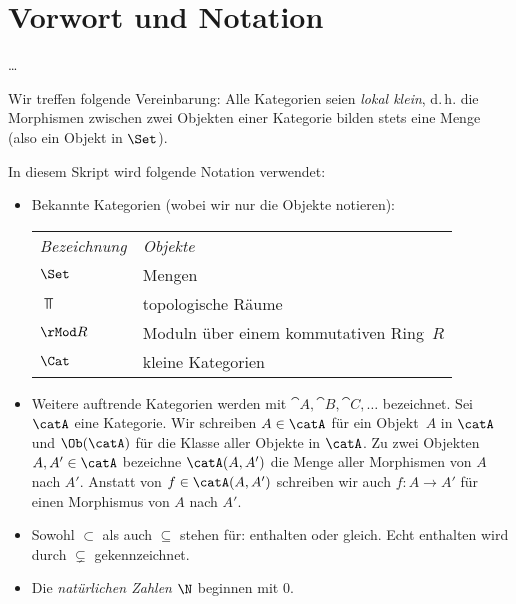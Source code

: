 
\chapter{Vorwort und Notation}
\ldots

\bigskip
Wir treffen folgende Vereinbarung:
Alle Kategorien seien \emph{lokal klein}, d.\,h. die Morphismen zwischen
zwei Objekten einer Kategorie bilden stets eine Menge (also ein Objekt
in $\Set$).

\bigskip
In diesem Skript wird folgende Notation verwendet:
\begin{itemize}
    \item
        Bekannte Kategorien (wobei wir nur die Objekte notieren):
        
        \hspace{6mm}
        \begin{tabular}{l@{\qquad}l}
            \emph{Bezeichnung} & \emph{Objekte}                         \\[2pt]
            $\Set$      &   Mengen                                      \\
            $\Top$      &   topologische Räume                          \\
            $\rMod R$   &   Moduln über einem kommutativen Ring~$R$     \\
            $\Cat$      &   kleine Kategorien
        \end{tabular}

    \item
        Weitere auftrende Kategorien werden mit $\cat A,\cat B, \cat C, \dots$
        bezeichnet. Sei $\catA$ eine Kategorie. Wir schreiben $A\in\catA$
        für ein Objekt~$A$ in $\catA$ und $\Ob(\catA)$ für die Klasse aller
        Objekte in $\catA$. Zu zwei Objekten $A,A'\in\catA$ bezeichne
        $\catA(A,A')$ die Menge aller Morphismen von $A$ nach $A'$.
        Anstatt von $f\in\catA(A,A')$ schreiben wir auch $f\colon A\to A'$ für
        einen Morphismus von $A$ nach $A'$.

    \item
        Sowohl $\subset$ als auch $\subseteq$ stehen für: enthalten oder gleich.
        Echt enthalten wird durch $\subsetneq$ gekennzeichnet.
    
    \item
        Die \emph{natürlichen Zahlen $\N$} beginnen mit $0$.
\end{itemize}
